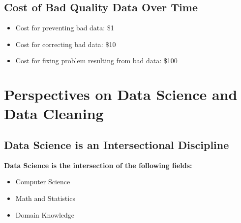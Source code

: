 \documentclass[11pt]{article}
\theoremstyle{definition}
\begin{document}
\subsection{Cost of Bad Quality Data Over Time}
\begin{itemize}
    \item Cost for preventing bad data: \$1
    \item Cost for correcting bad data: \$10
    \item Cost for fixing problem resulting from bad data: \$100
\end{itemize}

\section{Perspectives on Data Science
and Data Cleaning}
\subsection{Data Science is an Intersectional Discipline}
\textbf{Data Science is the intersection of the following fields:}
\begin{itemize}
    \item Computer Science
    \item Math and Statistics
    \item Domain Knowledge
\end{itemize}
\end{document}
